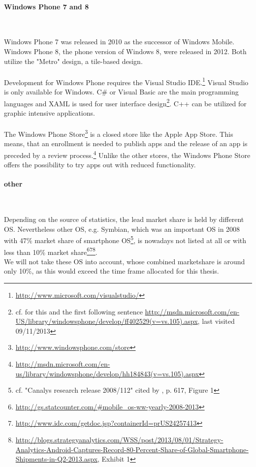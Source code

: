 \paragraph{Windows Phone 7 and 8}$\;$

\vspace{0.75em}
Windows Phone 7 was released in 2010 as the successor of Windows Mobile. Windows Phone 8, the phone version of Windows 8, were released in 2012. Both utilize the "Metro" design, a tile-based design.
\\
\\
Development for Windows Phone requires the Visual Studio IDE.\footnote{\url{http://www.microsoft.com/visualstudio/}} Visual Studio is only available for Windows. C\# or Visual Basic are the main programming languages and XAML is used for user interface design\footnote{cf. for this and the first following sentence \url{http://msdn.microsoft.com/en-US/library/windowsphone/develop/ff402529(v=vs.105).aspx}, last visited 09/11/2013}. C++ can be utilized for graphic intensive applications.
\\
\\
The Windows Phone Store\footnote{\url{http://www.windowsphone.com/store}} is a closed store like the Apple App Store. This means, that an enrollment is needed to publish apps and the release of an app is preceded by a review process.\footnote{\url{http://msdn.microsoft.com/en-us/library/windowsphone/develop/hh184843(v=vs.105).aspx}} Unlike the other stores, the Windows Phone Store offers the possibility to try apps out with reduced functionality.

\paragraph{other}$\;$

\vspace{0.75em}
Depending on the source of statistics, the lead market share is held by different OS. Nevertheless other OS, e.g. Symbian, which was an important OS in 2008 with 47\% market share of smartphone OS\footnote{cf. "Canalys research release 2008/112" cited by \cite{Lin.2009}, p. 617, Figure 1}, is nowadays not listed at all or with less than 10\% market share\footnote{\url{http://gs.statcounter.com/\#mobile_os-ww-yearly-2008-2013}}\footnote{\url{http://www.idc.com/getdoc.jsp?containerId=prUS24257413}}\footnote{\url{http://blogs.strategyanalytics.com/WSS/post/2013/08/01/Strategy-Analytics-Android-Captures-Record-80-Percent-Share-of-Global-Smartphone-Shipments-in-Q2-2013.aspx}, Exhibit 1}.
\\
We will not take these OS into account, whose combined marketshare is around only 10\%, as this would exceed the time frame allocated for this thesis.

